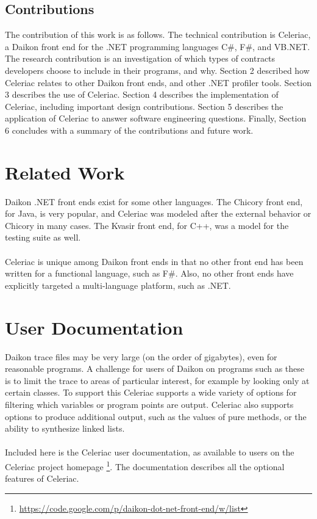 \documentclass{article}
\begin{document}
\subsection{Contributions}
The contribution of this work is as follows. The technical contribution is Celeriac, a Daikon front end for the .NET programming languages C\#, F\#, and VB.NET. The research contribution is an investigation of which types of contracts developers choose to include in their programs, and why. Section 2 described how Celeriac relates to other Daikon front ends, and other .NET profiler tools. Section 3 describes the use of Celeriac. Section 4 describes the implementation of Celeriac, including important design contributions. Section 5 describes the application of Celeriac to answer software engineering questions. Finally, Section 6 concludes with a summary of the contributions and future work.

\section{Related Work}
Daikon .NET front ends exist for some other languages. The Chicory front end, for Java, is very popular, and Celeriac was modeled after the external behavior or Chicory in many cases. The Kvasir front end, for C++, was a model for the testing suite as well.
\\ \\
Celeriac is unique among Daikon front ends in that no other front end has been written for a functional language, such as F\#. Also, no other front ends have explicitly targeted a multi-language platform, such as .NET.

\newpage
\section{User Documentation}
Daikon trace files may be very large (on the order of gigabytes), even for reasonable programs. A challenge for users of Daikon on programs such as these is to limit the trace to areas of particular interest, for example by looking only at certain classes. To support this Celeriac supports a wide variety of options for filtering which variables or program points are output. Celeriac also supports options to produce additional output, such as the values of pure methods, or the ability to synthesize linked lists.
\\ \\
Included here is the Celeriac user documentation, as available to users on the Celeriac project homepage \footnote{\url{https://code.google.com/p/daikon-dot-net-front-end/w/list}}. The documentation describes all the optional features of Celeriac.
\end{document}
